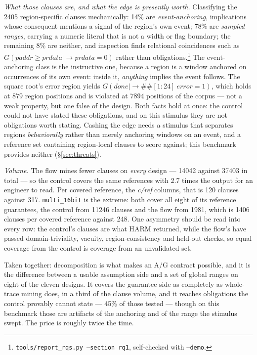 \emph{What those clauses are, and what the edge is presently worth.} Classifying the 2405
region-specific clauses mechanically: 14\% are \emph{event-anchoring}, implications whose
consequent mentions a signal of the region's own event; 78\% are \emph{sampled ranges},
carrying a numeric literal that is not a width or flag boundary; the remaining 8\% are neither,
and inspection finds relational coincidences such as
$G(\mathit{paddr} \geq \mathit{prdata} \mid\rightarrow \mathit{prdata} = 0)$ rather than
obligations.\footnote{\texttt{tools/report\_rqs.py --section rq1}, self-checked with
\texttt{--demo}.} The event-anchoring class is the instructive one, because a region is a window
anchored on occurrences of its own event: inside it, \emph{anything} implies the event follows.
The square root's error region yields
$G(\mathit{done} \mid\rightarrow \#\#[1{:}24]\ \mathit{error}=1)$, which holds at 879 region
positions and is violated at 7894 positions of the corpus --- not a weak property, but one
false of the design. Both facts hold at once: the control could not have stated these
obligations, and on this stimulus they are not obligations worth stating. Cashing the edge
needs a stimulus that separates regions \emph{behaviorally} rather than merely anchoring
windows on an event, and a reference set containing region-local clauses to score against;
this benchmark provides neither (\S\ref{sec:threats}).

\emph{Volume.} The flow mines fewer clauses on \emph{every} design --- 14042 against 37403 in
total --- so the control covers the same references with 2.7 times the output for an engineer
to read. Per covered reference, the \emph{c/ref} columns, that is 120 clauses against 317.
\texttt{multi\_16bit} is the extreme: both cover all eight of its reference guarantees, the
control from 11246 clauses and the flow from 1981, which is 1406 clauses per covered reference
against 248. One asymmetry should be read into every row: the control's clauses are what HARM
returned, while the flow's have passed domain-triviality, vacuity, region-consistency and
held-out checks, so equal coverage from the control is coverage from an unvalidated set.

Taken together: decomposition is what makes an A/G contract possible, and it is the difference
between a usable assumption side and a set of global ranges on eight of the eleven designs. It
covers the guarantee side as completely as whole-trace mining does, in a third of the clause
volume, and it reaches obligations the control provably cannot state --- 45\% of those tested
--- though on this benchmark those are artifacts of the anchoring and of the range the stimulus
swept. The price is roughly twice the time.

